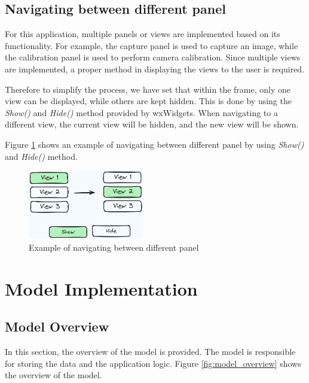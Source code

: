 \subsection{Navigating between different panel}
\label{subsec:navigating_between_different_panel}

For this application, multiple panels or views are implemented based on its functionality. For example, the capture panel is used to capture an image, while the calibration panel is used to perform camera calibration. Since multiple views are implemented, a proper method in displaying the views to the user is required.

Therefore to simplify the process, we have set that within the frame, only one view can be displayed, while others are kept hidden. This is done by using the \textit{Show()} and \textit{Hide()} method provided by wxWidgets. When navigating to a different view, the current view will be hidden, and the new view will be shown.

Figure \ref{fig:show_panel} shows an example of navigating between different panel by using \textit{Show()} and \textit{Hide()} method.

\begin{figure}[!ht]
    \centering
    \includegraphics[width=0.45\textwidth]{texs/Part2/chapter4/image/showpanel.png}
    \caption{Example of navigating between different panel}
    \label{fig:show_panel}
\end{figure}

\section{Model Implementation}
\label{sec:model_implementation}

\subsection{Model Overview}
\label{subsec:model_overview}
In this section, the overview of the model is provided. The model is responsible for storing the data and the application logic. Figure \ref{fig:model_overview} shows the overview of the model.

